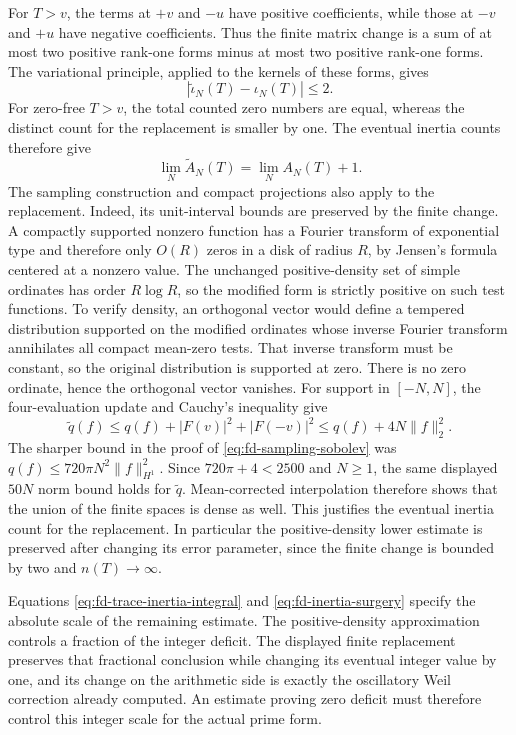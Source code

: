 For \(T>v\), the terms at \(+v\) and \(-u\) have positive
coefficients, while those at \(-v\) and \(+u\) have negative
coefficients. Thus the finite matrix change is a sum of at most two
positive rank-one forms minus at most two positive rank-one forms.
The variational principle, applied to the kernels of these forms,
gives
\[
 |\widetilde\iota_N(T)-\iota_N(T)|\le2.
\]
For zero-free \(T>v\), the total counted zero numbers are equal,
whereas the distinct count for the replacement is smaller by one.
The eventual inertia counts therefore give
\[
 \lim_N\widetilde A_N(T)=\lim_N A_N(T)+1.
\]
The sampling construction and compact projections also apply to the
replacement. Indeed, its unit-interval bounds are preserved by the
finite change. A compactly supported nonzero function has a Fourier
transform of exponential type and therefore only \(O(R)\) zeros in
a disk of radius \(R\), by Jensen's formula centered at a nonzero
value. The unchanged positive-density set of simple ordinates has
order \(R\log R\), so the modified form is strictly positive on
such test functions. To verify density, an orthogonal vector would
define a tempered distribution supported on the modified ordinates
whose inverse Fourier transform annihilates all compact mean-zero
tests. That inverse transform must be constant, so the original
distribution is supported at zero. There is no zero ordinate, hence
the orthogonal vector vanishes. For support in \([-N,N]\), the
four-evaluation update and Cauchy's inequality give
\[
 \widetilde q(f)\le q(f)+|F(v)|^2+|F(-v)|^2
 \le q(f)+4N\|f\|_2^2.
\]
The sharper bound in the proof of
\eqref{eq:fd-sampling-sobolev} was
\(q(f)\le720\pi N^2\|f\|_{H^1}^2\). Since
\(720\pi+4<2500\) and \(N\ge1\), the same displayed
\(50N\) norm bound holds for \(\widetilde q\).
Mean-corrected interpolation therefore shows that the union of the
finite spaces is dense as well. This justifies the eventual inertia count
for the replacement. In particular the positive-density lower estimate
is preserved after changing its error parameter, since the finite
change is bounded by two and \(n(T)\to\infty\).

Equations \eqref{eq:fd-trace-inertia-integral} and
\eqref{eq:fd-inertia-surgery} specify the absolute scale of the
remaining estimate. The positive-density approximation controls a
fraction of the integer deficit. The displayed finite replacement
preserves that fractional conclusion while changing its eventual
integer value by one, and its change on the arithmetic side is exactly
the oscillatory Weil correction already computed. An estimate proving
zero deficit must therefore control this integer scale for the actual
prime form.
